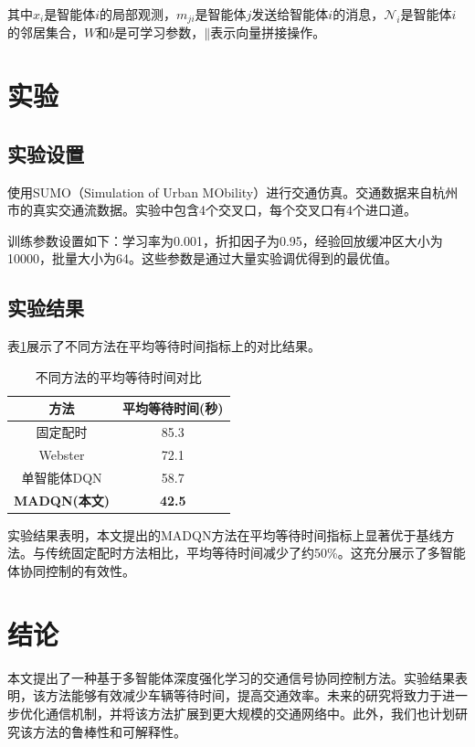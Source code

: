 \documentclass[12pt,a4paper]{article}
\begin{document}
其中$x_i$是智能体$i$的局部观测，$m_{ji}$是智能体$j$发送给智能体$i$的消息，$\mathcal{N}_i$是智能体$i$的邻居集合，$W$和$b$是可学习参数，$\mathbin{\|}$表示向量拼接操作。

\section{实验}

\subsection{实验设置}

使用SUMO（Simulation of Urban MObility）进行交通仿真。交通数据来自杭州市的真实交通流数据。实验中包含4个交叉口，每个交叉口有4个进口道。

训练参数设置如下：学习率为0.001，折扣因子为0.95，经验回放缓冲区大小为10000，批量大小为64。这些参数是通过大量实验调优得到的最优值。

\subsection{实验结果}

表\ref{tab:results}展示了不同方法在平均等待时间指标上的对比结果。

\begin{table}[h]
\centering
\caption{不同方法的平均等待时间对比}
\label{tab:results}
\begin{tabular}{|c|c|}
\hline
方法 & 平均等待时间(秒) \\
\hline
固定配时 & 85.3 \\
Webster & 72.1 \\
单智能体DQN & 58.7 \\
\textbf{MADQN(本文)} & \textbf{42.5} \\
\hline
\end{tabular}
\end{table}

实验结果表明，本文提出的MADQN方法在平均等待时间指标上显著优于基线方法。与传统固定配时方法相比，平均等待时间减少了约50\%。这充分展示了多智能体协同控制的有效性。

\section{结论}

本文提出了一种基于多智能体深度强化学习的交通信号协同控制方法。实验结果表明，该方法能够有效减少车辆等待时间，提高交通效率。未来的研究将致力于进一步优化通信机制，并将该方法扩展到更大规模的交通网络中。此外，我们也计划研究该方法的鲁棒性和可解释性。
\end{document}
